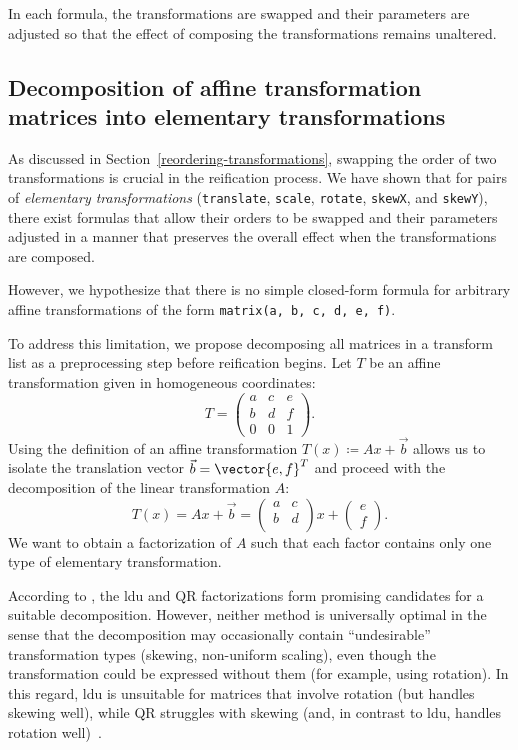 In each formula, the transformations are swapped and their parameters are adjusted so that the effect of composing the transformations remains unaltered.

\subsection{Decomposition of affine transformation matrices into elementary transformations} \label{matrix-decomposition}

As discussed in Section~\ref{reordering-transformations}, swapping the order of two transformations is crucial in the reification process. We have shown that for pairs of \emph{elementary transformations} (\texttt{translate}, \texttt{scale}, \texttt{rotate}, \texttt{skewX}, and \texttt{skewY}), there exist formulas that allow their orders to be swapped and their parameters adjusted in a manner that preserves the overall effect when the transformations are composed. 

However, we hypothesize that there is no simple closed-form formula for arbitrary affine transformations of the form \texttt{matrix(a, b, c, d, e, f)}.

To address this limitation, we propose decomposing all matrices in a transform list as a preprocessing step before reification begins. Let $T$ be an affine transformation given in homogeneous coordinates:
\[
    T = 
    \begin{pmatrix}
        a & c & e \\
        b & d & f \\
        0 & 0 & 1
    \end{pmatrix}
    \text{.}
\]
Using the definition of an affine transformation $T\left(x\right) \coloneqq Ax + \vec{b}$ allows us to isolate the translation vector $\vec{b} = \vector{e, f}^T$ and proceed with the decomposition of the linear transformation $A$:
\[
    T\left(x\right) = Ax + \vec{b} =
    \begin{pmatrix}
        a & c \\
        b & d \\
    \end{pmatrix}
    x +
    \begin{pmatrix}
        e \\
        f
    \end{pmatrix}
    \text{.}
\]
We want to obtain a factorization of $A$ such that each factor contains only one type of elementary transformation.

According to \textcite{wang2013decomposition}, the \gls{ldu} and QR factorizations form promising candidates for a suitable decomposition. However, neither method is universally optimal in the sense that the decomposition may occasionally contain \enquote{undesirable} transformation types (skewing, non-uniform scaling), even though the transformation could be expressed without them (for example, using rotation). In this regard, \gls{ldu} is unsuitable for matrices that involve rotation (but handles skewing well), while QR struggles with skewing (and, in contrast to \gls{ldu}, handles rotation well)~\cite{wang2013decomposition}.

